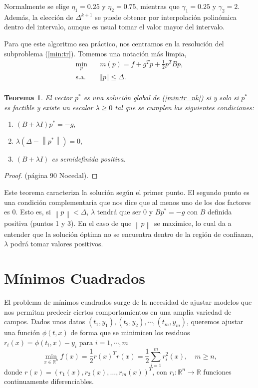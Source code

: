 \documentclass[11pt,a4paper]{book}
\newtheorem{theorem}{Teorema}[chapter]
\theoremstyle{definition}
\theoremstyle{remark}
\newcommand{\norm}[1]{\left\lVert#1\right\rVert}
\begin{document}
Normalmente se elige $\eta_1 = 0.25$ y $\eta_2 = 0.75$, mientras que $\gamma_1 = 0.25$ y $\gamma_2 = 2$.
Además, la elección de $\Delta^{k+1}$ se puede obtener por interpolación polinómica dentro del intervalo,
aunque es usual tomar el valor mayor del intervalo.

Para que este algoritmo sea práctico, nos centramos en la resolución del subproblema (\ref{min:tr}). Tomemos una notación más limpia,
\begin{equation}
\label{min:tr_nk}
\begin{aligned}
	\min_{p} \quad & m(p) = f + g^Tp + \frac{1}{2}p^TBp, \\
	\text{s.a.} \quad & \Vert p \Vert \leq \Delta. \\
\end{aligned}
\end{equation}

\begin{theorem} \label{th:trustregion}
	El vector $p^*$ es una solución global de (\ref{min:tr_nk}) si y solo si $p^*$ es factible y existe un escalar $\lambda \geq 0$ tal que se cumplen las siguientes condiciones:
\begin{enumerate}
	\item $(B+\lambda I)p^*=-g,$
	\item $\lambda (\Delta - \norm{p^*}) = 0,$
	\item $(B+\lambda I)$ es semidefinida positiva.
\end{enumerate}
\end{theorem}
\begin{proof}
(página 90 Nocedal).
\end{proof}

Este teorema caracteriza la solución según el primer punto. El segundo punto es una condición complementaria que nos dice que al menos uno de los dos factores es 0.
Esto es, si $\norm{p}<\Delta$, $\lambda$ tendrá que ser 0 y $Bp^*=-g$ con $B$ definida positiva (puntos 1 y 3).
En el caso de que $\norm{p}$ se maximice, lo cual da a entender que la solución óptima no se encuentra dentro de la región de confianza, $\lambda$ podrá tomar valores positivos.

\chapter{Mínimos Cuadrados}

El problema de mínimos cuadrados surge de la necesidad de ajustar modelos que nos permitan predecir ciertos comportamientos en una amplia variedad de campos. Dados unos datos $(t_1,y_1),(t_2,y_2),\cdots,(t_m,y_m)$, queremos ajustar una función
$\phi(t,x)$ de forma que se minimicen los residuos $r_i(x) = \phi(t_i,x) - y_i$ para $i=1,\cdots,m$
\begin{equation}
	\min_{x\in \mathbb{R}^{n}}f(x) = \frac{1}{2} r(x)^Tr(x) = \frac{1}{2}\sum_{i=1}^{m}r_i^2(x), \quad m\geq n,
	\label{eq:lsp}
\end{equation}
donde $r(x) = (r_1(x), r_2(x), \ldots, r_m(x))^T$, con $r_i : \mathbb{R}^{n} \rightarrow \mathbb{R}$ funciones continuamente diferenciables. 
\end{document}
